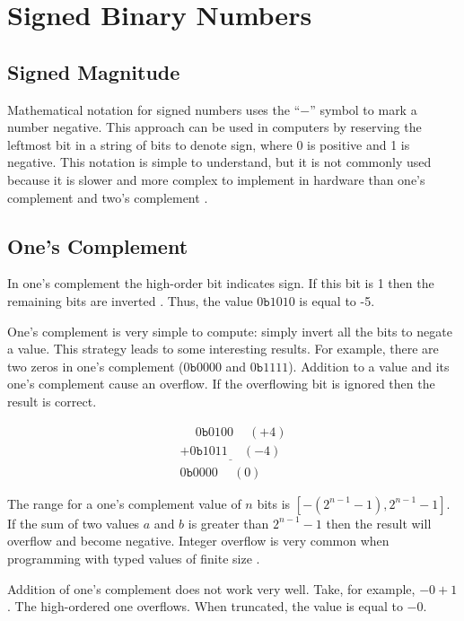 \documentclass{book}
\begin{document}
\section{Signed Binary Numbers}\label{signedbinary}

\subsection{Signed Magnitude}

Mathematical notation for signed numbers uses the ``$-$'' symbol to mark a number negative. This approach can be used in computers by reserving the leftmost bit in a string of bits to denote sign, where 0 is positive and 1 is negative. This notation is simple to understand, but it is not commonly used because it is slower and more complex to implement in hardware than one's complement and two's complement \cite{smoler}.

\subsection{One's Complement}
In one's complement the high-order bit indicates sign. If this bit is 1 then the remaining bits are inverted \cite{lin_onescomp_2003}. Thus, the value $0\texttt{b}1010$ is equal to -5.

One's complement is very simple to compute: simply invert all the bits to negate a value. This strategy leads to some interesting results. For example, there are two zeros in one's complement ($0\texttt{b}0000$ and $0\texttt{b}1111$). Addition to a value and its one's complement cause an overflow. If the overflowing bit is ignored then the result is correct.

\begin{equation*}
\begin{array}{c}
\phantom{+}0\texttt{b}0100 \phantom{+}(+4) \\
\underline{+0\texttt{b}1011 \phantom{+}(-4)} \\
0\texttt{b}0000 \phantom{+}(0)
\end{array}
\end{equation*}

The range for a one's complement value of $n$ bits is $[-(2^{n-1}-1),2^{n-1}-1]$. If the sum of two values $a$ and $b$ is greater than $2^{n-1}-1$ then the result will overflow and become negative. Integer overflow is very common when programming with typed values of finite size \cite{seacord_2017}.

Addition of one's complement does not work very well. Take, for example, $-0 + 1$. The high-ordered one overflows. When truncated, the value is equal to $-0$.
\end{document}
